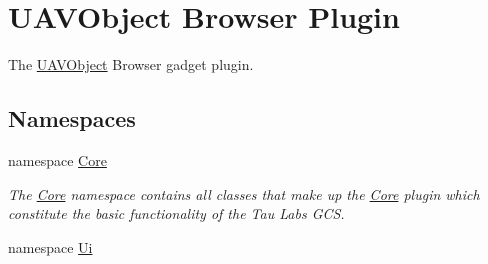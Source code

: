 \hypertarget{group___u_a_v_object_browser_plugin}{\section{U\-A\-V\-Object Browser Plugin}
\label{group___u_a_v_object_browser_plugin}
}


The \hyperlink{class_u_a_v_object}{U\-A\-V\-Object} Browser gadget plugin.  


\subsection*{Namespaces}
\begin{DoxyCompactItemize}
\item 
namespace \hyperlink{namespace_core}{Core}
\begin{DoxyCompactList}\small\item\em The \hyperlink{namespace_core}{Core} namespace contains all classes that make up the \hyperlink{namespace_core}{Core} plugin which constitute the basic functionality of the Tau Labs G\-C\-S. \end{DoxyCompactList}\item 
namespace \hyperlink{namespace_ui}{Ui}
\end{DoxyCompactItemize}
